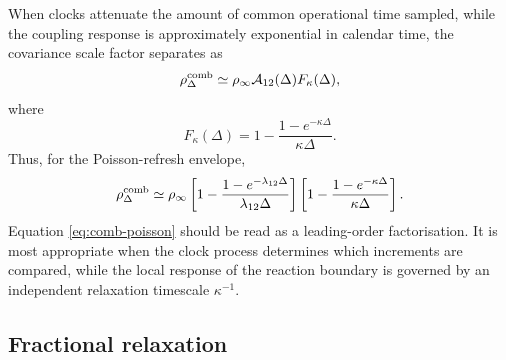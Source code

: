 \documentclass[5p,final]{elsarticle}
\begin{document}
When clocks attenuate the amount of common operational time sampled, while the coupling response is approximately exponential in calendar time, the covariance scale factor separates as
\begin{equation}
\rho_\Delta^{\rm comb}
\simeq
\rho_\infty\mathcal A_{12}(\Delta)F_\kappa(\Delta),
\label{eq:comb-separable}
\end{equation}
where
\begin{equation}
F_\kappa(\Delta)
=1-\frac{1-e^{-\kappa\Delta}}{\kappa\Delta}.
\end{equation}
Thus, for the Poisson-refresh envelope,
\begin{equation}
\rho_\Delta^{\rm comb}
\simeq
\rho_\infty
\left[1-\frac{1-e^{-\lambda_{12}\Delta}}{\lambda_{12}\Delta}\right]
\left[1-\frac{1-e^{-\kappa\Delta}}{\kappa\Delta}\right].
\label{eq:comb-poisson}
\end{equation}
Equation \eqref{eq:comb-poisson} should be read as a leading-order factorisation.  It is most appropriate when the clock process determines which increments are compared, while the local response of the reaction boundary is governed by an independent relaxation timescale $\kappa^{-1}$.

\subsection{Fractional relaxation}
\end{document}
